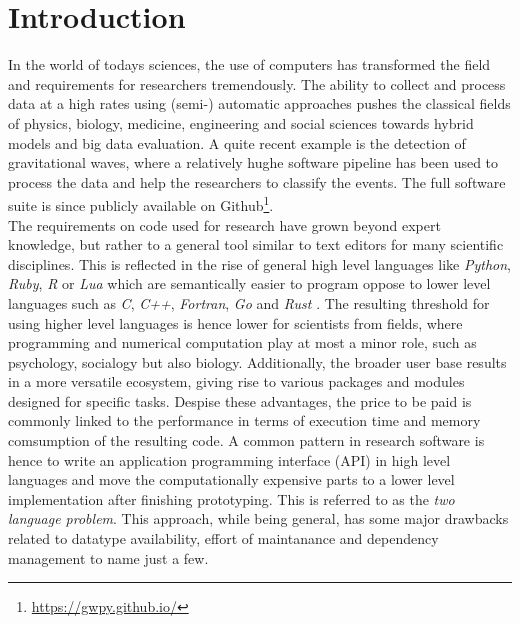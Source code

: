 \section{Introduction}
\label{JM:sec:introduction}

In the world of todays sciences, the use of computers has transformed the field and requirements for researchers tremendously. 
The ability to collect and process data at a high rates using (semi-) automatic approaches pushes the classical fields of 
physics, biology, medicine, engineering and social sciences towards hybrid models and big data evaluation. A quite recent example is the detection of gravitational waves, 
where a relatively hughe software pipeline \cite{JMMacleodEtAl2021} has been used to process the data and help the researchers to classify the events. The full software suite is since publicly available on Github\footnote{\url{https://gwpy.github.io/}}.\\


The requirements on code used for research have grown beyond expert knowledge, but rather to a general tool similar to text editors for many scientific disciplines. This is reflected in the rise of 
general high level languages like \textit{Python}, \textit{Ruby}, \textit{R} or \textit{Lua} \cite{JMVanRossumDrake2009,JMThomasEtAl2005, JMRCT2016, JMIerusalimschy2006} which are semantically easier to program oppose to lower level languages such as 
\textit{C}, \textit{C++}, \textit{Fortran}, \textit{Go} and \textit{Rust} \cite{JMKernighanRitchie2006, JMStroustrup2013, JMBackusHeising1964, JMMeyerson2014, JMMatsakisKlockII2014}. The resulting threshold for using higher level languages is hence lower for scientists from fields, where programming and numerical
computation play at most a minor role, such as psychology, socialogy but also biology. Additionally, the broader user base results in a more versatile ecosystem, giving rise to various packages and modules designed
for specific tasks. Despise these advantages, the price to be paid is commonly linked to the performance in terms of execution time and memory comsumption of the resulting code. A common pattern in 
research software is hence to write an application programming interface (API) in high level languages and move the computationally expensive parts to a lower level implementation after finishing prototyping. This is referred to 
as the \textit{two language problem}. This approach, while being general, has some major drawbacks related to datatype availability, effort of maintanance and dependency management to name just a few.\\

